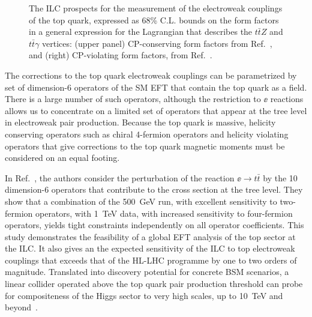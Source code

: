 \begin{figure}[tb]
\begin{center}
\caption{The ILC prospects for the measurement of the electroweak couplings of the top quark, expressed as 68\% C.L. bounds on the form factors in a general expression 
for the Lagrangian that describes the $t\bar{t}Z$ and $t\bar{t}\gamma$ vertices:
(upper panel) CP-conserving form factors from Ref.~\cite{Abramowicz:2016zbo}, 
and (right) CP-violating form factors, from Ref.~\cite{Bernreuther:2017cyi}.
\label{fig:top_ew_couplings}}
 \end{center}
 \vspace{-0.7cm}
 \end{figure}
 

The corrections to the top quark electroweak couplings can 
be parametrized by set of 
dimension-6 operators of the SM EFT that contain the top quark as a
field. There is a large number of such operators, although the
restriction to $\ee$ reactions allows us to concentrate on a limited
set of operators that appear at the tree level in electroweak pair
production.
Because the top quark is massive, helicity conserving operators such
as chiral 4-fermion operators and helicity violating operators that
give corrections to the top quark magnetic moments must be considered
on an equal footing. 

In 
Ref.~\cite{Durieux:2018tev}, the authors consider the
perturbation of the reaction $\ee\to t\bar t$ by the 10 dimension-6
operators that contribute to the cross section at the tree level.
They show that a combination of
 the 500~GeV run, with excellent sensitivity to two-fermion operators,
with 1~TeV{} data, with increased sensitivity to four-fermion
operators, yields  tight constraints independently on 
all operator coefficients.  This study demonstrates the feasibility of a global EFT analysis 
of the top sector at the ILC.  It also gives an the expected sensitivity of the ILC to
top electroweak couplings that  exceeds that of the HL-LHC programme by one to two orders of
magnitude. Translated into discovery potential for concrete BSM scenarios, a linear collider 
operated above the top quark pair production threshold can probe for compositeness of the Higgs
sector to very high scales, up to 10~TeV and
beyond~\cite{Durieux:2018ekg}. 




